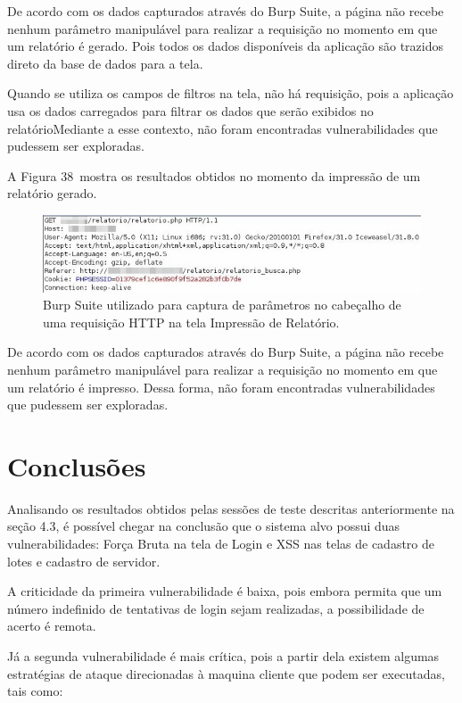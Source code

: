 \documentclass[
    12pt,               %
    openright,          %
    oneside,            %
    a4paper,            %
    section=TITLE,     %
    english,            %
    french,             %
    spanish,            %
    brazil              %
    ]{abntex2}
\begin{document}
De acordo com os dados capturados através do Burp Suite, a página não recebe nenhum parâmetro manipulável para realizar a requisição no momento em que um relatório é gerado. Pois todos os dados disponíveis da aplicação são trazidos direto da base de dados para a tela.


Quando se utiliza os campos de filtros na tela, não há requisição, pois a aplicação usa os dados carregados para filtrar os dados que serão exibidos no relatórioMediante a esse contexto, não foram encontradas vulnerabilidades que pudessem ser exploradas.


A Figura 38~mostra os resultados obtidos no momento da impressão de um relatório gerado.





\begin{figure}[htp]
\centering
\caption{Burp Suite utilizado para captura de parâmetros no cabeçalho de uma requisição HTTP na tela Impressão de Relatório.}
\includegraphics{imagem35Editada.jpeg}
\end{figure}
\ifdefined\FloatBarrier \FloatBarrier \fi


De acordo com os dados capturados através do Burp Suite, a página não recebe nenhum parâmetro manipulável para realizar a requisição no momento em que um relatório é impresso. Dessa forma, não foram encontradas vulnerabilidades que pudessem ser exploradas.



\chapter{Conclusões}

Analisando os resultados obtidos pelas sessões de teste descritas anteriormente na seção 4.3, é possível chegar na conclusão que o sistema alvo possui duas vulnerabilidades: Força Bruta na tela de Login e XSS nas telas de cadastro de lotes e cadastro de servidor.


A criticidade da primeira vulnerabilidade é baixa, pois embora permita que um número indefinido de tentativas de login sejam realizadas, a possibilidade de acerto é remota.


Já a segunda vulnerabilidade é mais crítica, pois a partir dela existem algumas estratégias de ataque direcionadas à maquina cliente que podem ser executadas, tais como:
\end{document}

